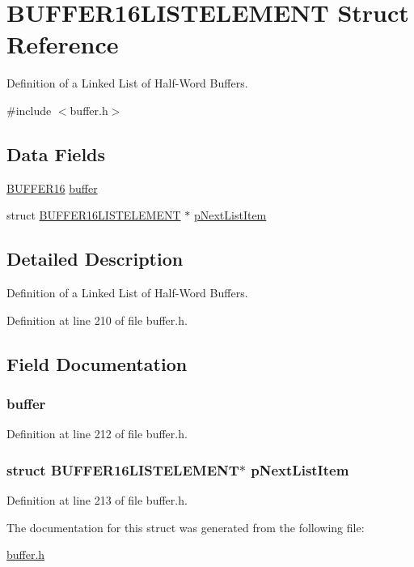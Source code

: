 \hypertarget{a00003}{
\section{BUFFER16LISTELEMENT Struct Reference}
\label{a00003}
}


Definition of a Linked List of Half-\/Word Buffers.  




{\ttfamily \#include $<$buffer.h$>$}

\subsection*{Data Fields}
\begin{DoxyCompactItemize}
\item 
\hyperlink{a00002}{BUFFER16} \hyperlink{a00003_a2a7ab48ef68ab4d801116c81b3498b5b}{buffer}
\item 
struct \hyperlink{a00003}{BUFFER16LISTELEMENT} $\ast$ \hyperlink{a00003_a3b33cfc713fa99fd4384689f24714e35}{pNextListItem}
\end{DoxyCompactItemize}


\subsection{Detailed Description}
Definition of a Linked List of Half-\/Word Buffers. 

Definition at line 210 of file buffer.h.



\subsection{Field Documentation}
\hypertarget{a00003_a2a7ab48ef68ab4d801116c81b3498b5b}{
\subsubsection[{buffer}]{ {\bf buffer}}}
\label{a00003_a2a7ab48ef68ab4d801116c81b3498b5b}


Definition at line 212 of file buffer.h.

\hypertarget{a00003_a3b33cfc713fa99fd4384689f24714e35}{
\subsubsection[{pNextListItem}]{\setlength{\rightskip}{0pt plus 5cm}struct {\bf BUFFER16LISTELEMENT}$\ast$ {\bf pNextListItem}}}
\label{a00003_a3b33cfc713fa99fd4384689f24714e35}


Definition at line 213 of file buffer.h.



The documentation for this struct was generated from the following file:\begin{DoxyCompactItemize}
\item 
\hyperlink{a00465}{buffer.h}\end{DoxyCompactItemize}
